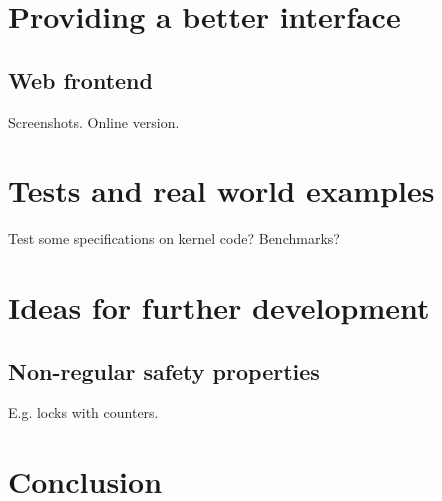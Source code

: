\chapter{Providing a better interface}
\section{Web frontend}
Screenshots.
Online version.


\chapter{Tests and real world examples}
Test some specifications on kernel code?
Benchmarks?


\chapter{Ideas for further development}
\section{Non-regular safety properties}
E.g. locks with counters.


\chapter{Conclusion}

